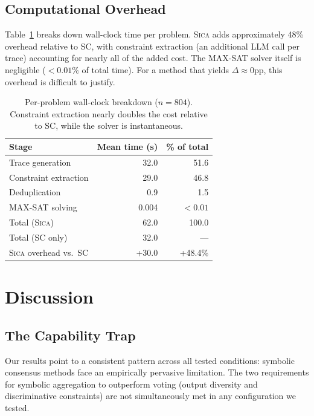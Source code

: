 \documentclass[11pt,a4paper]{article}
\newcommand{\sica}{\textsc{Sica}}
\begin{document}
\subsection{Computational Overhead}

Table~\ref{tab:overhead} breaks down wall-clock time per problem. \sica{} adds approximately 48\% overhead relative to SC, with constraint extraction (an additional LLM call per trace) accounting for nearly all of the added cost. The MAX-SAT solver itself is negligible ($< 0.01\%$ of total time). For a method that yields $\Delta \approx 0$pp, this overhead is difficult to justify.

\begin{table}[t]
\centering
\caption{Per-problem wall-clock breakdown ($n = 804$). Constraint extraction nearly doubles the cost relative to SC, while the solver is instantaneous.}
\label{tab:overhead}
\small
\begin{tabular}{lrr}
\toprule
\textbf{Stage} & \textbf{Mean time (s)} & \textbf{\% of total} \\
\midrule
Trace generation & 32.0 & 51.6 \\
Constraint extraction & 29.0 & 46.8 \\
Deduplication & 0.9 & 1.5 \\
MAX-SAT solving & 0.004 & $<0.01$ \\
\midrule
Total (\sica{}) & 62.0 & 100.0 \\
Total (SC only) & 32.0 & --- \\
\sica{} overhead vs.\ SC & +30.0 & +48.4\% \\
\bottomrule
\end{tabular}
\end{table}

\section{Discussion}

\subsection{The Capability Trap}

Our results point to a consistent pattern across all tested conditions: symbolic consensus methods face an empirically pervasive limitation. The two requirements for symbolic aggregation to outperform voting (output diversity and discriminative constraints) are not simultaneously met in any configuration we tested.
\end{document}

